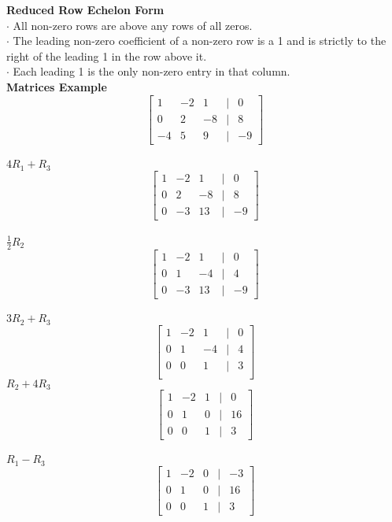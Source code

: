 \documentclass[]{article}
\begin{document}
\textbf{Reduced Row Echelon Form}\\
$\cdot$ All non-zero rows are above any rows of all zeros.\\
$\cdot$ The leading non-zero coefficient of a non-zero row is a 1 and is strictly to the right of the leading 1 in the row above it.\\
$\cdot$ Each leading 1 is the only non-zero entry in that column.\\

\textbf{Matrices Example}\\
\[
\begin{bmatrix}
	1 & -2 & 1 & | & 0 \\
	0 & 2 & -8 & | & 8 \\
	-4 & 5 & 9 & | & -9
\end{bmatrix}
\]\\
$4R_1 + R_3$\\
\[
\begin{bmatrix}
	1 & -2 & 1 & | & 0 \\
	0 & 2 & -8 & | & 8 \\
	0 & -3 & 13 & | & -9
\end{bmatrix}
\]\\
$\frac{1}{2}R_2$\\
\[
\begin{bmatrix}
	1 & -2 & 1 & | & 0 \\
	0 & 1 & -4 & | & 4 \\
	0 & -3 & 13 & | & -9
\end{bmatrix}
\]\\
$3R_2 + R_3$\\
\[
\begin{bmatrix}
	1 & -2 & 1 & | & 0 \\
	0 & 1 & -4 & | & 4 \\
	0 & 0 & 1 & | & 3 \\
\end{bmatrix}
\]
$R_2 + 4R_3$\\
\[
\begin{bmatrix}
	1 & -2 & 1 & | & 0 \\
	0 & 1 & 0 & | & 16 \\
	0 & 0 & 1 & | & 3
\end{bmatrix}
\]\\
$R_1 - R_3$\\
\[
\begin{bmatrix}
	1 & -2 & 0 & | & -3 \\
	0 & 1 & 0 & | & 16 \\
	0 & 0 & 1 & | & 3
\end{bmatrix}
\]\\
\end{document}
